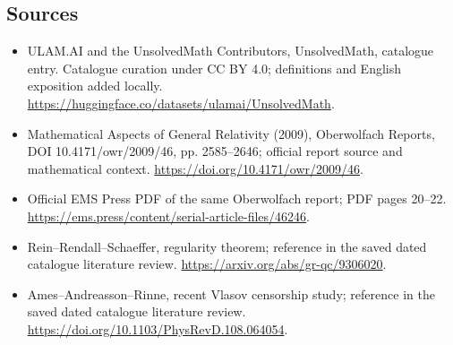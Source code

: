 \documentclass[11pt]{article}
\begin{document}
\subsection{Sources}
\begin{itemize}
\item[\hypertarget{source:statement:1}{S1}] ULAM.AI and the UnsolvedMath Contributors, UnsolvedMath, catalogue entry. Catalogue curation under CC BY 4.0; definitions and English exposition added locally.
\url{https://huggingface.co/datasets/ulamai/UnsolvedMath}.
\item[\hypertarget{source:statement:2}{S2}] Mathematical Aspects of General Relativity (2009), Oberwolfach Reports, DOI 10.4171/owr/2009/46, pp. 2585--2646; official report source and mathematical context.
\url{https://doi.org/10.4171/owr/2009/46}.
\item[\hypertarget{source:statement:3}{S3}] Official EMS Press PDF of the same Oberwolfach report; PDF pages 20--22.
\url{https://ems.press/content/serial-article-files/46246}.
\item[\hypertarget{source:statement:4}{S4}] Rein--Rendall--Schaeffer, regularity theorem; reference in the saved dated catalogue literature review.
\url{https://arxiv.org/abs/gr-qc/9306020}.
\item[\hypertarget{source:statement:5}{S5}] Ames--Andreasson--Rinne, recent Vlasov censorship study; reference in the saved dated catalogue literature review.
\url{https://doi.org/10.1103/PhysRevD.108.064054}.
\end{itemize}
\label{end:statement}
\end{document}

